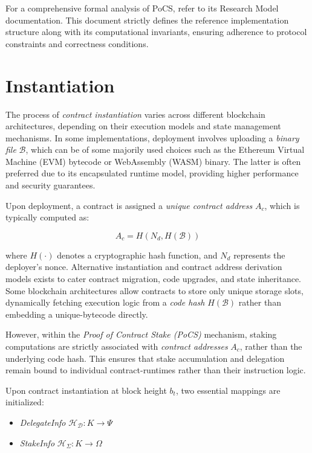 \documentclass{article}
\begin{document}
For a comprehensive formal analysis of PoCS, refer to its Research Model documentation. This document strictly defines the reference implementation structure along with its computational invariants, ensuring adherence to protocol constraints and correctness conditions.


\section{Instantiation}

The process of \textit{contract instantiation} varies across different blockchain architectures, depending on their execution models and state management mechanisms. In some implementations, deployment involves uploading a \textit{binary file} \( \mathcal{B} \), which can be of some majorily used choices such as the Ethereum Virtual Machine (EVM) bytecode or WebAssembly (WASM) binary. The latter is often preferred due to its encapsulated runtime model, providing higher performance and security guarantees. 

Upon deployment, a contract is assigned a \textit{unique contract address} \( A_c \), which is typically computed as:

\begin{equation}
A_c = H(N_d, H(\mathcal{B}))
\end{equation}

where \( H(\cdot) \) denotes a cryptographic hash function, and \( N_d \) represents the deployer’s nonce. Alternative instantiation and contract address derivation models exists to cater contract migration, code upgrades, and state inheritance. Some blockchain architectures allow contracts to store only unique storage slots, dynamically fetching execution logic from a \textit{code hash} \( H(\mathcal{B}) \) rather than embedding a unique-bytecode directly.

However, within the \textit{Proof of Contract Stake (PoCS)} mechanism, staking computations are strictly associated with \textit{contract addresses} \( A_c \), rather than the underlying code hash. This ensures that stake accumulation and delegation remain bound to individual contract-runtimes rather than their instruction logic.

Upon contract instantiation at block height \( b_t \), two essential mappings are initialized:

\begin{itemize}
    \item \textit{DelegateInfo} \( \mathcal{H}_\mathcal{D}: K \to \Psi \)
    \item \textit{StakeInfo} \( \mathcal{H}_{\Sigma}: K \to \Omega \)
\end{itemize}
\end{document}
